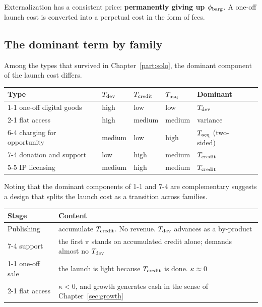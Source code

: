 Externalization has a consistent price: \textbf{permanently giving up $\phi_{\rm barg}$}.
A one-off launch cost is converted into a perpetual cost in the form of fees.

\subsection{The dominant term by family}

Among the types that survived in Chapter~\ref{part:solo}, the dominant component of the
launch cost differs.

\begin{center}
\begin{tabular}{@{}llllll@{}}
\toprule
Type & $T_{\rm dev}$ & $T_{\rm credit}$ & $T_{\rm acq}$ & Dominant \\
\midrule
1-1 one-off digital goods & high & low & low & $T_{\rm dev}$ \\
2-1 flat access & high & medium & medium & variance \\
6-4 charging for opportunity & medium & low & high & $T_{\rm acq}$ (two-sided) \\
7-4 donation and support & low & high & medium & $T_{\rm credit}$ \\
5-5 IP licensing & medium & high & medium & $T_{\rm credit}$ \\
\bottomrule
\end{tabular}
\label{tab:startup-cost-by-type}
\end{center}

Noting that the dominant components of 1-1 and 7-4 are complementary suggests a design that
splits the launch cost as a transition across families.

\begin{center}
\begin{tabularx}{\textwidth}{@{}lX@{}}
\toprule
Stage & Content \\
\midrule
Publishing & accumulate $T_{\rm credit}$. No revenue. $T_{\rm dev}$ advances as a by-product \\
7-4 support & the first $\pi$ stands on accumulated credit alone; demands almost no $T_{\rm dev}$ \\
1-1 one-off sale & the launch is light because $T_{\rm credit}$ is done. $\kappa\approx 0$ \\
2-1 flat access & $\kappa<0$, and growth generates cash in the sense of Chapter~\ref{sec:growth} \\
\bottomrule
\end{tabularx}
\label{tab:phase-transition-design}
\end{center}

